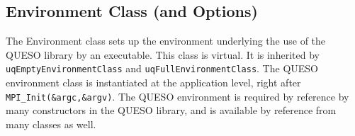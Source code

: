 % 
% 
% 
% 
% 
% 


\subsection{Environment Class (and Options)}\label{sec:environment_class}

%
The Environment class sets up the environment underlying the use of the QUESO library by an executable.
This class is virtual. It is inherited by \verb+uqEmptyEnvironmentClass+ and \verb+uqFullEnvironmentClass+.
    The QUESO environment class is instantiated at the application level, right after \verb+MPI_Init(&argc,&argv)+. 
    The QUESO environment is required by reference by many constructors in the QUESO library, and is available by reference from many classes as well.

